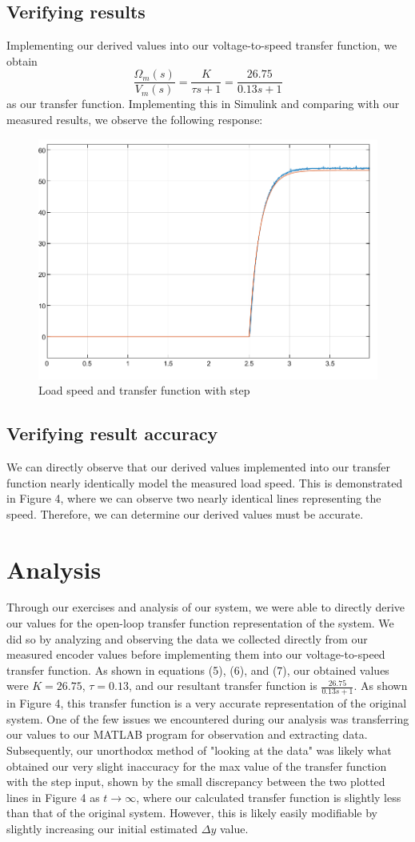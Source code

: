 \documentclass{article}
\begin{document}
\subsection{Verifying results}
Implementing our derived values into our voltage-to-speed transfer function, we obtain
\begin{equation}
    \frac{\Omega_m(s)}{V_m(s)}=\frac{K}{\tau s+1}=\frac{26.75}{0.13s+1}
\end{equation}
as our transfer function. Implementing this in Simulink and comparing with our measured results, we observe the following response:
\begin{figure}
    \centering
    \includegraphics[width=0.5\linewidth]{wm2.png}
    \caption{Load speed and transfer function with step}
    \label{fig:analysis}
\end{figure}

\subsection{Verifying result accuracy}
We can directly observe that our derived values implemented into our transfer function nearly identically model the measured load speed. This is demonstrated in Figure 4, where we can observe two nearly identical lines representing the speed. Therefore, we can determine our derived values must be accurate.

\section{Analysis}
Through our exercises and analysis of our system, we were able to directly derive our values for the open-loop transfer function representation of the system. We did so by analyzing and observing the data we collected directly from our measured encoder values before implementing them into our voltage-to-speed transfer function. As shown in equations (5), (6), and (7), our obtained values were $K=26.75$, $\tau=0.13$, and our resultant transfer function is $\frac{26.75}{0.13s+1}$. As shown in Figure 4, this transfer function is a very accurate representation of the original system. One of the few issues we encountered during our analysis was transferring our values to our MATLAB program for observation and extracting data. Subsequently, our unorthodox method of "looking at the data" was likely what obtained our very slight inaccuracy for the max value of the transfer function with the step input, shown by the small discrepancy between the two plotted lines in Figure 4 as $t\to\infty$, where our calculated transfer function is slightly less than that of the original system. However, this is likely easily modifiable by slightly increasing our initial estimated $\Delta y$ value.
\end{document}
